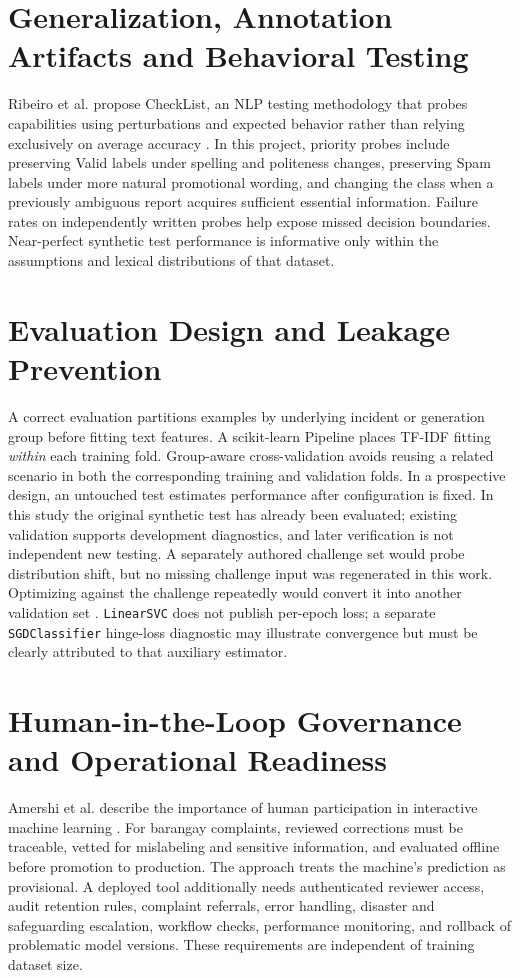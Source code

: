 \section{Generalization, Annotation Artifacts and Behavioral Testing}
Ribeiro et al. propose CheckList, an NLP testing methodology that probes capabilities using perturbations and expected behavior rather than relying exclusively on average accuracy \cite{ribeiro}. In this project, priority probes include preserving Valid labels under spelling and politeness changes, preserving Spam labels under more natural promotional wording, and changing the class when a previously ambiguous report acquires sufficient essential information. Failure rates on independently written probes help expose missed decision boundaries. Near-perfect synthetic test performance is informative only within the assumptions and lexical distributions of that dataset.

\section{Evaluation Design and Leakage Prevention}
A correct evaluation partitions examples by underlying incident or generation group before fitting text features. A scikit-learn Pipeline places TF-IDF fitting \emph{within} each training fold. Group-aware cross-validation avoids reusing a related scenario in both the corresponding training and validation folds. In a prospective design, an untouched test estimates performance after configuration is fixed. In this study the original synthetic test has already been evaluated; existing validation supports development diagnostics, and later verification is not independent new testing. A separately authored challenge set would probe distribution shift, but no missing challenge input was regenerated in this work. Optimizing against the challenge repeatedly would convert it into another validation set \cite{sklearn}. \texttt{LinearSVC} does not publish per-epoch loss; a separate \texttt{SGDClassifier} hinge-loss diagnostic may illustrate convergence but must be clearly attributed to that auxiliary estimator.

\section{Human-in-the-Loop Governance and Operational Readiness}
Amershi et al. describe the importance of human participation in interactive machine learning \cite{amershi}. For barangay complaints, reviewed corrections must be traceable, vetted for mislabeling and sensitive information, and evaluated offline before promotion to production. The approach treats the machine's prediction as provisional. A deployed tool additionally needs authenticated reviewer access, audit retention rules, complaint referrals, error handling, disaster and safeguarding escalation, workflow checks, performance monitoring, and rollback of problematic model versions. These requirements are independent of training dataset size.
